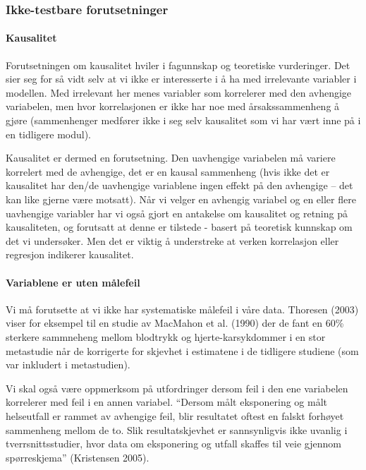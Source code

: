 \documentclass[
]{article}
\begin{document}
\hypertarget{ikke-testbare-forutsetninger}{%
\subsubsection{Ikke-testbare
forutsetninger}\label{ikke-testbare-forutsetninger}}

\hypertarget{kausalitet}{%
\paragraph{Kausalitet}\label{kausalitet}}

Forutsetningen om kausalitet hviler i fagunnskap og teoretiske
vurderinger. Det sier seg for så vidt selv at vi ikke er interesserte i
å ha med irrelevante variabler i modellen. Med irrelevant her menes
variabler som korrelerer med den avhengige variabelen, men hvor
korrelasjonen er ikke har noe med årsakssammenheng å gjøre (sammenhenger
medfører ikke i seg selv kausalitet som vi har vært inne på i en
tidligere modul).

Kausalitet er dermed en forutsetning. Den uavhengige variabelen må
variere korrelert med de avhengige, det er en kausal sammenheng (hvis
ikke det er kausalitet har den/de uavhengige variablene ingen effekt på
den avhengige -- det kan like gjerne være motsatt). Når vi velger en
avhengig variabel og en eller flere uavhengige variabler har vi også
gjort en antakelse om kausalitet og retning på kausaliteten, og
forutsatt at denne er tilstede - basert på teoretisk kunnskap om det vi
undersøker. Men det er viktig å understreke at verken korrelasjon eller
regresjon indikerer kausalitet.

\hypertarget{variablene-er-uten-muxe5lefeil}{%
\paragraph{Variablene er uten
målefeil}\label{variablene-er-uten-muxe5lefeil}}

Vi må forutsette at vi ikke har systematiske målefeil i våre data.
Thoresen (2003) viser for eksempel til en studie av MacMahon et al.
(1990) der de fant en 60\% sterkere sammneheng mellom blodtrykk og
hjerte-karsykdommer i en stor metastudie når de korrigerte for skjevhet
i estimatene i de tidligere studiene (som var inkludert i metastudien).

Vi skal også være oppmerksom på utfordringer dersom feil i den ene
variabelen korrelerer med feil i en annen variabel. ``Dersom målt
eksponering og målt helseutfall er rammet av avhengige feil, blir
resultatet oftest en falskt forhøyet sammenheng mellom de to. Slik
resultatskjevhet er sannsynligvis ikke uvanlig i tverrsnittsstudier,
hvor data om eksponering og utfall skaffes til veie gjennom
spørreskjema'' (Kristensen 2005).
\end{document}
